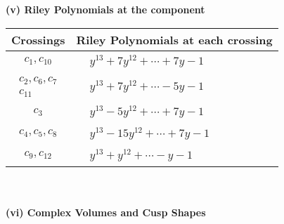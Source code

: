 \documentclass[1p]{elsarticle_modified}
\theoremstyle{definition}
\begin{document}
\newpage\renewcommand{\arraystretch}{1}
\flushleft \textbf{(v) Riley Polynomials at the component}\newline \\
\begin{tabular}{m{50pt}|m{274pt}}
Crossings & \hspace{64pt}Riley Polynomials at each crossing \\
\hline $$\begin{aligned}c_{1},c_{10}\end{aligned}$$&$\begin{aligned}
&y^{13}+7 y^{12}+\cdots+7 y-1
\end{aligned}$\\
\hline $$\begin{aligned}c_{2},c_{6},c_{7}\\c_{11}\end{aligned}$$&$\begin{aligned}
&y^{13}+7 y^{12}+\cdots-5 y-1
\end{aligned}$\\
\hline $$\begin{aligned}c_{3}\end{aligned}$$&$\begin{aligned}
&y^{13}-5 y^{12}+\cdots+7 y-1
\end{aligned}$\\
\hline $$\begin{aligned}c_{4},c_{5},c_{8}\end{aligned}$$&$\begin{aligned}
&y^{13}-15 y^{12}+\cdots+7 y-1
\end{aligned}$\\
\hline $$\begin{aligned}c_{9},c_{12}\end{aligned}$$&$\begin{aligned}
&y^{13}+y^{12}+\cdots- y-1
\end{aligned}$\\
\hline
\end{tabular}\\~\\
\newpage\flushleft \textbf{(vi) Complex Volumes and Cusp Shapes}
\end{document}
